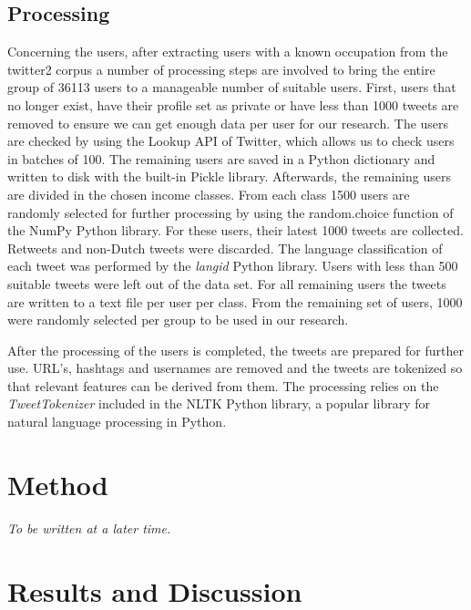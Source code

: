 \documentclass[
10pt, %
a4paper, %
oneside, %
headinclude,footinclude, %
] {book}%
\begin{document}

\section{Processing}
Concerning the users, after extracting users with a known occupation from the twitter2 corpus a number of processing steps are involved to bring the entire group of 36113 users to a manageable number of suitable users. First, users that no longer exist, have their profile set as private or have less than 1000 tweets are removed to ensure we can get enough data per user for our research. The users are checked by using the Lookup API of Twitter, which allows us to check users in batches of 100. The remaining users are saved in a Python dictionary and written to disk with the built-in Pickle library. Afterwards, the remaining users are divided in the chosen income classes. From each class 1500 users are randomly selected for further processing by using the random.choice function of the NumPy Python library. For these users, their latest 1000 tweets are collected. Retweets and non-Dutch tweets were discarded. The language classification of each tweet was performed by the \textit{langid} Python library. Users with less than 500 suitable tweets were left out of the data set. For all remaining users the tweets are written to a text file per user per class. From the remaining set of users, 1000 were randomly selected per group to be used in our research.

After the processing of the users is completed, the tweets are prepared for further use. URL's, hashtags and usernames are removed and the tweets are tokenized so that relevant features can be derived from them. The processing relies on the \textit{TweetTokenizer} included in the NLTK Python library, a popular library for natural language processing in Python.

\chapter{Method}

\textit{To be written at a later time.}


\chapter{Results and Discussion}
\end{document}
